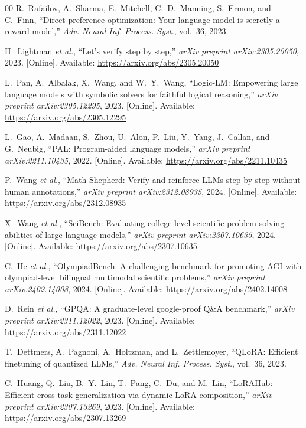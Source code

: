 \documentclass{ieeeaccess}
\begin{document}
\begin{thebibliography}{00}
R.~Rafailov, A.~Sharma, E.~Mitchell, C.~D.~Manning, S.~Ermon,
and C.~Finn,
``Direct preference optimization: Your language model is secretly a
reward model,''
\emph{Adv. Neural Inf. Process. Syst.}, vol.~36, 2023.

H.~Lightman \emph{et al.},
``Let's verify step by step,''
\emph{arXiv preprint arXiv:2305.20050}, 2023. [Online]. Available:
\underline{https://arxiv.org/abs/2305.20050}

L.~Pan, A.~Albalak, X.~Wang, and W.~Y.~Wang,
``{Logic-LM}: Empowering large language models with symbolic solvers
for faithful logical reasoning,''
\emph{arXiv preprint arXiv:2305.12295}, 2023. [Online]. Available:
\underline{https://arxiv.org/abs/2305.12295}

L.~Gao, A.~Madaan, S.~Zhou, U.~Alon, P.~Liu, Y.~Yang, J.~Callan,
and G.~Neubig,
``{PAL}: Program-aided language models,''
\emph{arXiv preprint arXiv:2211.10435}, 2022. [Online]. Available:
\underline{https://arxiv.org/abs/2211.10435}

P.~Wang \emph{et al.},
``Math-Shepherd: Verify and reinforce {LLMs} step-by-step without human
annotations,''
\emph{arXiv preprint arXiv:2312.08935}, 2024. [Online]. Available:
\underline{https://arxiv.org/abs/2312.08935}

X.~Wang \emph{et al.},
``{SciBench}: Evaluating college-level scientific problem-solving
abilities of large language models,''
\emph{arXiv preprint arXiv:2307.10635}, 2024. [Online]. Available:
\underline{https://arxiv.org/abs/2307.10635}

C.~He \emph{et al.},
``{OlympiadBench}: A challenging benchmark for promoting {AGI} with
olympiad-level bilingual multimodal scientific problems,''
\emph{arXiv preprint arXiv:2402.14008}, 2024. [Online]. Available:
\underline{https://arxiv.org/abs/2402.14008}

D.~Rein \emph{et al.},
``{GPQA}: A graduate-level google-proof {Q\&A} benchmark,''
\emph{arXiv preprint arXiv:2311.12022}, 2023. [Online]. Available:
\underline{https://arxiv.org/abs/2311.12022}

T.~Dettmers, A.~Pagnoni, A.~Holtzman, and L.~Zettlemoyer,
``{QLoRA}: Efficient finetuning of quantized {LLMs},''
\emph{Adv. Neural Inf. Process. Syst.}, vol.~36, 2023.

C.~Huang, Q.~Liu, B.~Y.~Lin, T.~Pang, C.~Du, and M.~Lin,
``{LoRAHub}: Efficient cross-task generalization via dynamic {LoRA}
composition,''
\emph{arXiv preprint arXiv:2307.13269}, 2023. [Online]. Available:
\underline{https://arxiv.org/abs/2307.13269}


\end{thebibliography}
\end{document}
